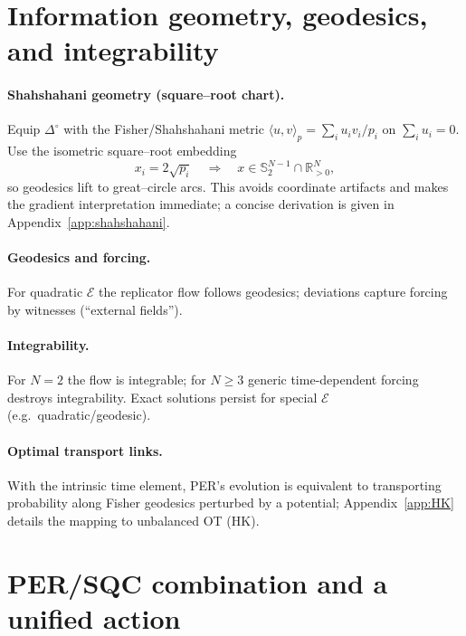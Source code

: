 \documentclass[11pt]{article}
\begin{document}
\section{Information geometry, geodesics, and integrability}\label{sec:info-geom}

\paragraph{Shahshahani geometry (square–root chart).}
Equip $\Delta^\circ$ with the Fisher/Shahshahani metric $\langle u,v\rangle_p=\sum_i u_i v_i/p_i$ on $\sum_i u_i=0$.
Use the isometric square–root embedding
\[
x_i = 2\sqrt{p_i}\quad\Rightarrow\quad x\in \mathbb{S}^{N-1}_2\cap\mathbb{R}^N_{>0},
\]
so geodesics lift to great–circle arcs. This avoids coordinate artifacts and makes the gradient interpretation immediate; a concise derivation is given in Appendix~\ref{app:shahshahani}.

\paragraph{Geodesics and forcing.}
For quadratic $\mathcal{E}$ the replicator flow follows geodesics; deviations capture forcing by witnesses (``external fields'').

\paragraph{Integrability.}
For $N=2$ the flow is integrable; for $N\ge 3$ generic time-dependent forcing destroys integrability. Exact solutions persist for special $\mathcal{E}$ (e.g.\ quadratic/geodesic).

\paragraph{Optimal transport links.}
With the intrinsic time element, PER's evolution is equivalent to transporting probability along Fisher geodesics perturbed by a potential; Appendix~\ref{app:HK} details the mapping to unbalanced OT (HK).


\section{PER/SQC combination and a unified action}
\label{sec:per-sqc-unified}
\end{document}
